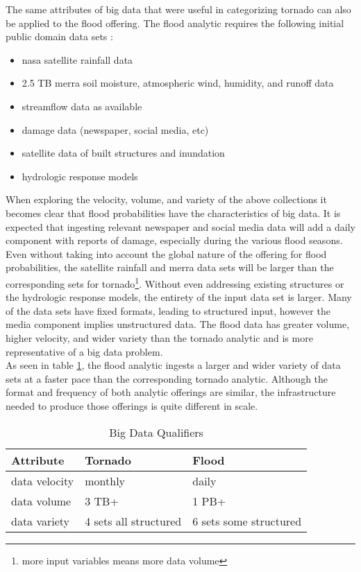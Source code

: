The same attributes of big data that were useful in categorizing tornado can also be applied to the flood offering. The flood analytic requires the following initial public domain data sets \cite{walker}:
\begin{itemize}
    \item \gls{nasa} satellite rainfall data
    \item 2.5 TB \gls{merra} soil moisture, atmospheric wind, humidity, and runoff data
    \item streamflow data as available
    \item damage data (newspaper, social media, etc)
    \item satellite data of built structures and inundation
    \item hydrologic response models
\end{itemize}
When exploring the velocity, volume, and variety of the above collections it becomes clear that flood probabilities have the characteristics of big data. It is expected that ingesting relevant newspaper and social media data will add a daily component with reports of damage, especially during the various flood seasons. Even without taking into account the global nature of the offering for flood probabilities, the satellite rainfall and \gls{merra} data sets will be larger than the corresponding sets for tornado\footnote{more input variables means more data volume}. Without even addressing existing structures or the hydrologic response models, the entirety of the input data set is larger. Many of the data sets have fixed formats, leading to structured input, however the media component implies unstructured data. The flood data has greater volume, higher velocity, and wider variety than the tornado analytic and is more representative of a big data problem.\\

As seen in table \ref{qualifiers}, the flood analytic ingests a larger and wider variety of data sets at a faster pace than the corresponding tornado analytic. Although the format and frequency of both analytic offerings are similar, the infrastructure needed to produce those offerings is quite different in scale.
\begin{table}[htbp]
    \centering
    \begin{tabular}{l l l}
        \hline
        Attribute & Tornado & Flood\\ [0.5ex]
        \hline
        data velocity & monthly & daily\\
        data volume &  3 TB+  & 1 PB+\\
        data variety &  4 sets all structured & 6 sets some structured\\
        \hline
    \end{tabular}
    \caption{Big Data Qualifiers}
    \label{qualifiers}
\end{table}
